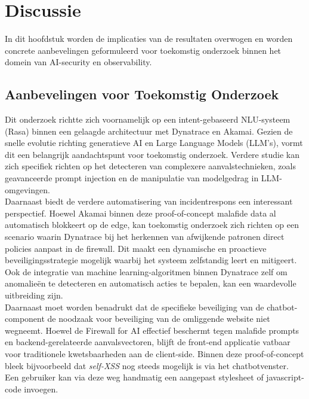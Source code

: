 
\chapter{Discussie}%
\label{ch:discussie}

In dit hoofdstuk worden de implicaties van de resultaten overwogen en worden concrete aanbevelingen geformuleerd voor toekomstig onderzoek binnen het domein van AI-security en observability.

\section{Aanbevelingen voor Toekomstig Onderzoek}%
\label{sec:toekomstig-onderzoek}

Dit onderzoek richtte zich voornamelijk op een intent-gebaseerd NLU-systeem (Rasa) binnen een gelaagde architectuur met Dynatrace en Akamai. Gezien de snelle evolutie richting generatieve AI en Large Language Models (LLM’s), vormt dit een belangrijk aandachtspunt voor toekomstig onderzoek. Verdere studie kan zich specifiek richten op het detecteren van complexere aanvalstechnieken, zoals geavanceerde prompt injection en de manipulatie van modelgedrag in LLM-omgevingen.\\

Daarnaast biedt de verdere automatisering van incidentrespons een interessant perspectief. Hoewel Akamai binnen deze proof-of-concept malafide data al automatisch blokkeert op de edge, kan toekomstig onderzoek zich richten op een scenario waarin Dynatrace bij het herkennen van afwijkende patronen direct policies aanpast in de firewall. Dit maakt een dynamische en proactieve beveiligingsstrategie mogelijk waarbij het systeem zelfstandig leert en mitigeert. Ook de integratie van machine learning-algoritmen binnen Dynatrace zelf om anomalieën te detecteren en automatisch acties te bepalen, kan een waardevolle uitbreiding zijn.\\

Daarnaast moet worden benadrukt dat de specifieke beveiliging van de chatbot-component de noodzaak voor beveiliging van de omliggende website niet wegneemt. Hoewel de Firewall for AI effectief beschermt tegen malafide prompts en backend-gerelateerde aanvalsvectoren, blijft de front-end applicatie vatbaar voor traditionele kwetsbaarheden aan de client-side. Binnen deze proof-of-concept bleek bijvoorbeeld dat \textit{self-XSS} nog steeds mogelijk is via het chatbotvenster. Een gebruiker kan via deze weg handmatig een aangepast stylesheet of javascript-code invoegen.\\

